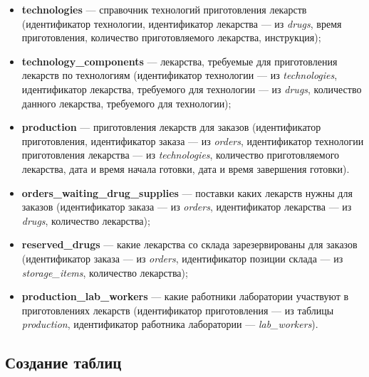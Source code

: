 \documentclass[a4paper]{article}
\newcommand{\dbtable}[1]{\textbf{#1}}
\newcommand{\dbtableref}[1]{\textit{#1}}
\begin{document}
\begin{itemize}
				\item \dbtable{technologies} --- справочник технологий приготовления лекарств (идентификатор технологии, идентификатор лекарства --- из \dbtableref{drugs}, время приготовления, количество приготовляемого лекарства, инструкция);
					
				\item \dbtable{technology\_components} --- лекарства, требуемые для приготовления лекарств по технологиям (идентификатор технологии --- из \dbtableref{technologies}, идентификатор лекарства, требуемого для технологии --- из \dbtableref{drugs}, количество данного лекарства, требуемого для технологии);
								
				\item \dbtable{production} --- приготовления лекарств для заказов (идентификатор приготовления, идентификатор заказа --- из \dbtableref{orders}, идентификатор технологии приготовления лекарства --- из \dbtableref{technologies}, количество приготовляемого лекарства, дата и время начала готовки, дата и время завершения готовки).
								
				\item \dbtable{orders\_waiting\_drug\_supplies} --- поставки каких лекарств нужны для заказов (идентификатор заказа --- из \dbtableref{orders}, идентификатор лекарства --- из \dbtableref{drugs}, количество лекарства);
					
				\item \dbtable{reserved\_drugs} --- какие лекарства со склада зарезервированы для заказов (идентификатор заказа --- из \dbtableref{orders}, идентификатор позиции склада --- из \dbtableref{storage\_items}, количество лекарства);
				
				\item \dbtable{production\_lab\_workers} --- какие работники лаборатории участвуют в приготовлениях лекарств (идентификатор приготовления --- из таблицы \dbtableref{production}, идентификатор работника лаборатории --- \dbtableref{lab\_workers}).
			\end{itemize}
		\subsection{Создание таблиц}
			
\end{document}
